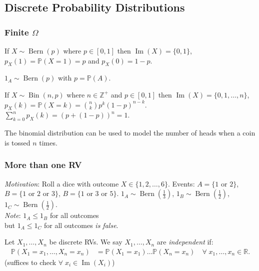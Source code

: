 \subsection{Discrete Probability Distributions}

\subsubsection{Finite $\Omega$}

\begin{definition}
    If $X \sim \operatorname{Bern}(p)$ where $p \in [0, 1]$ then $\operatorname{Im}(X) = \{0, 1\}$, $p_X(1) = \mathbb{P}(X = 1) = p$ and $p_X(0) = 1 - p$.
\end{definition} 

\begin{example}
    $1_A \sim \operatorname{Bern}(p)$ with $p = \mathbb{P}(A)$.
\end{example} 

\begin{definition}
    If $X \sim \operatorname{Bin}(n, p)$ where $n \in \mathbb{Z}^+$ and $p \in [0, 1]$ then $\operatorname{Im}(X) = \{0, 1, \dots, n\}$, $p_X(k) = \mathbb{P}(X = k) = \binom{n}{k} p^k (1- p)^{n -k}$.
    $\sum_{k=0}^{n} p_X(k) = (p + (1-p))^n = 1$.
\end{definition} 

The binomial distribution can be used to model the number of heads when a coin is tossed $n$ times.

\subsubsection{More than one RV}

\emph{Motivation}: Roll a dice with outcome $X \in \{1, 2, \dots, 6\}$.
Events: $A = \{1 \text{ or } 2\}$, $B = \{1 \text{ or } 2 \text{ or } 3\}$, $B = \{1 \text{ or } 3 \text{ or } 5\}$.
$1_A \sim \operatorname{Bern}\left(\frac{1}{3}\right)$, $1_B \sim \operatorname{Bern}\left(\frac{1}{2}\right)$, $1_C \sim \operatorname{Bern}\left(\frac{1}{2}\right)$.\\
\emph{Note}: $1_A \leq 1_B$ for all outcomes \\
but $1_A \leq 1_C$ for all outcomes \emph{is false}.

\begin{definition}
    Let $X_1, \dots, X_n$ be discrete RVs.
    We say $X_1, \dots, X_n$ are \emph{independent} if:
    \begin{align*}
        \mathbb{P}(X_1 = x_1, \dots, X_n = x_n) &= \mathbb{P}(X_1 = x_1) \dots \mathbb{P}(X_n = x_n) \quad \forall \; x_1, \dots, x_n \in \mathbb{R}.
    \end{align*} 
    \color{blue} (suffices to check $\forall \; x_i \in \operatorname{Im}(X_i)$)
\end{definition} 

